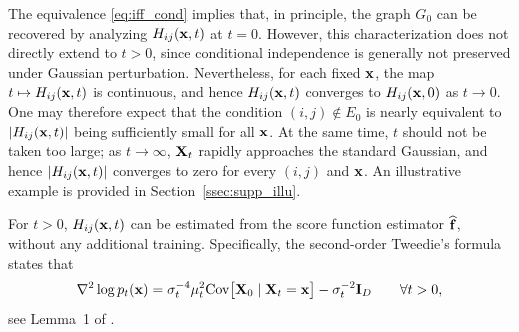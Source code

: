 \documentclass[11pt,a4paper,final]{article}
\numberwithin{equation}{section}
\theoremstyle{remark}
\newcommand{\bff}{{\bf f}}
\newcommand{\bI}{{\bf I}}
\newcommand{\bx}{{\bf x}}
\newcommand{\bX}{{\bf X}}
\newcommand{\be}{\begin{equation}}
\newcommand{\ee}{\end{equation}}
\newcommand{\bean}{\setlength\arraycolsep{1pt}\begin{eqnarray*}}
\newcommand{\eean}{\end{eqnarray*}}
\begin{document}
The equivalence \eqref{eq:iff_cond} implies that, in principle, the graph $G_0$ can be recovered by analyzing $H_{ij}(\bx,t)$ at $t = 0$.
However, this characterization does not directly extend to $t>0$, since conditional independence is generally not preserved under Gaussian perturbation.
Nevertheless, for each fixed $\bx$, the map $t \mapsto H_{ij}(\bx,t)$ is continuous, and hence $H_{ij}(\bx,t)$ converges to $H_{ij}(\bx,0)$ as $t \to 0$.
One may therefore expect that the condition $(i,j) \notin E_{0}$ is nearly equivalent to $\vert H_{ij}(\bx,t) \vert$ being sufficiently small for all $\bx$.
At the same time, $t$ should not be taken too large; as $t \rightarrow \infty$, $\bX_{t}$ rapidly approaches the standard Gaussian, and hence $\vert H_{ij}(\bx,t) \vert$ converges to zero for every $(i,j)$ and $\bx$.
An illustrative example is provided in Section~\ref{ssec:supp_illu}.


For $t > 0$, $H_{ij}(\bx,t)$ can be estimated from the score function estimator $\widehat \bff$, without any additional training.
Specifically, the second-order Tweedie's formula states that
\be
 \nabla^2 \log p_t (\bx)
= \sigma_{t}^{-4} \mu_{t}^2 \text{Cov} \big[ \bX_{0} \mid \bX_{t} = \bx \big]  - \sigma_{t}^{-2} \bI_{D} \qquad \forall t > 0,
\label{eq:tweedie}
\ee
see Lemma~1 of \cite{wainwright2025score}.
\end{document}

